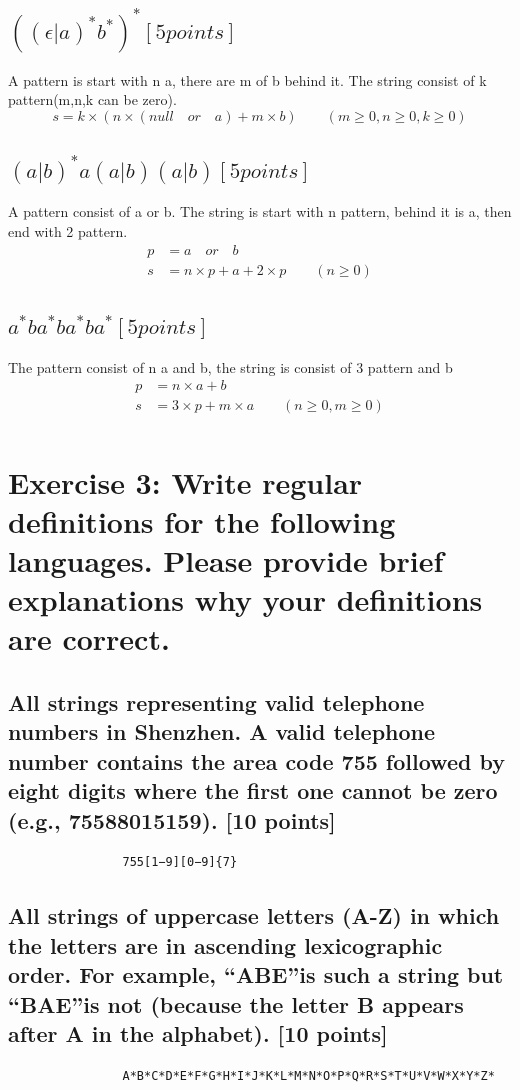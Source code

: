 \documentclass{article}
\begin{document}
        \subsection{$((\epsilon|a)^*b^*)^*[5 points]$}
            A pattern is start with n a, there are m of b behind it. The string consist of k pattern(m,n,k can be zero).
            $$s = k × (n × (null\quad or\quad a) + m × b)\qquad(m\geq 0, n\geq 0,k\geq 0)$$
        \subsection{$(a|b)^*a(a|b)(a|b) [5 points]$}
            A pattern consist of a or b. The string is start with n pattern, behind it is a, then end with 2 pattern.
            \begin{align*}
                p &= a\quad or\quad b\\
                s &= n × p + a + 2 × p\qquad (n\geq 0)
            \end{align*}
        \subsection{$a^*ba^*ba^*ba^*[5 points]$}
            The pattern consist of n a and b, the string is consist of 3 pattern and b
            \begin{align*}
                p &= n × a + b\\
                s &= 3 × p + m × a\qquad(n\geq 0, m\geq 0)\\
            \end{align*}
    \section{Exercise 3: Write regular definitions for the following languages. Please provide brief explanations why your definitions are correct.}
        \subsection{All strings representing valid telephone numbers in Shenzhen. A valid telephone number
        contains the area code 755 followed by eight digits where the first one cannot be zero (e.g.,
        75588015159). [10 points]}
            \begin{lstlisting}
                755[1−9][0−9]{7}
            \end{lstlisting}
        \subsection{All strings of uppercase letters (A-Z) in which the letters are in ascending lexicographic order. For example, “ABE”is such a string but “BAE”is not (because the letter B appears after A in the alphabet). [10 points]}
            \begin{lstlisting}
                A*B*C*D*E*F*G*H*I*J*K*L*M*N*O*P*Q*R*S*T*U*V*W*X*Y*Z*
            \end{lstlisting}
\end{document}
